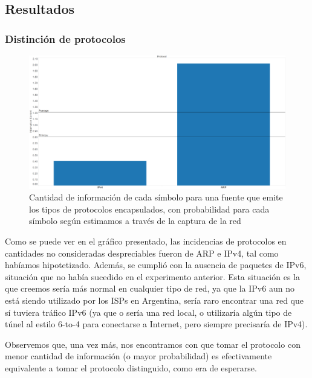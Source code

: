 \documentclass{article}
\theoremstyle{definition}
\theoremstyle{remark}
\begin{document}
\subsection{Resultados}

\subsubsection{Distinción de protocolos}

\begin{figure}[H]
\centering
\includegraphics[width=450pt]{captures/McDonalds/20min/Protocol PDF Dashboard.png}
\caption{Cantidad de información de cada símbolo para una fuente que emite los tipos de protocolos encapsulados, con probabilidad para cada símbolo según estimamos a través de la captura de la red}
\end{figure}

Como se puede ver en el gráfico presentado, las incidencias de protocolos en cantidades no consideradas despreciables fueron de ARP e IPv4, tal como habíamos hipotetizado. Además, se cumplió con la ausencia de paquetes de IPv6, situación que no había sucedido en el experimento anterior. Esta situación es la que creemos sería más normal en cualquier tipo de red, ya que la IPv6 aun no está siendo utilizado por los ISPs en Argentina, sería raro encontrar una red que sí tuviera tráfico IPv6 (ya que o sería una red local, o utilizaría algún tipo de túnel al estilo 6-to-4 para conectarse a Internet, pero siempre precisaría de IPv4). 

Observemos que, una vez más, nos encontramos con que tomar el protocolo con menor cantidad de información (o mayor probabilidad) es efectivamente equivalente a tomar el protocolo distinguido, como era de esperarse.
\end{document}
